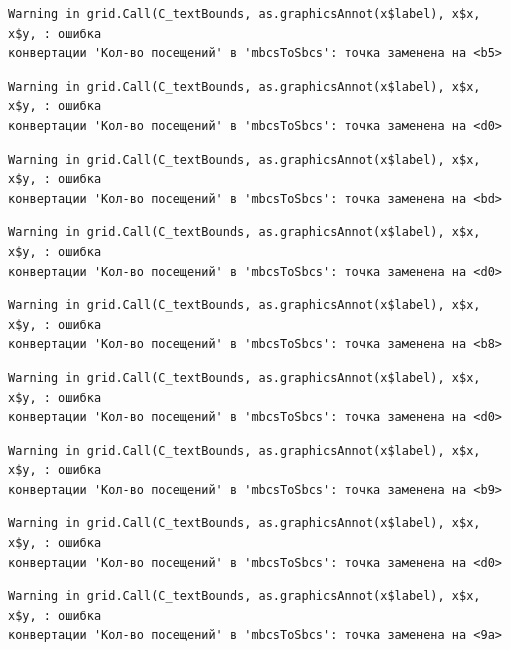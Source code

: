\documentclass[
  letterpaper,
  DIV=11,
  numbers=noendperiod]{scrreprt}
\begin{document}
\begin{verbatim}
Warning in grid.Call(C_textBounds, as.graphicsAnnot(x$label), x$x, x$y, : ошибка
конвертации 'Кол-во посещений' в 'mbcsToSbcs': точка заменена на <b5>
\end{verbatim}

\begin{verbatim}
Warning in grid.Call(C_textBounds, as.graphicsAnnot(x$label), x$x, x$y, : ошибка
конвертации 'Кол-во посещений' в 'mbcsToSbcs': точка заменена на <d0>
\end{verbatim}

\begin{verbatim}
Warning in grid.Call(C_textBounds, as.graphicsAnnot(x$label), x$x, x$y, : ошибка
конвертации 'Кол-во посещений' в 'mbcsToSbcs': точка заменена на <bd>
\end{verbatim}

\begin{verbatim}
Warning in grid.Call(C_textBounds, as.graphicsAnnot(x$label), x$x, x$y, : ошибка
конвертации 'Кол-во посещений' в 'mbcsToSbcs': точка заменена на <d0>
\end{verbatim}

\begin{verbatim}
Warning in grid.Call(C_textBounds, as.graphicsAnnot(x$label), x$x, x$y, : ошибка
конвертации 'Кол-во посещений' в 'mbcsToSbcs': точка заменена на <b8>
\end{verbatim}

\begin{verbatim}
Warning in grid.Call(C_textBounds, as.graphicsAnnot(x$label), x$x, x$y, : ошибка
конвертации 'Кол-во посещений' в 'mbcsToSbcs': точка заменена на <d0>
\end{verbatim}

\begin{verbatim}
Warning in grid.Call(C_textBounds, as.graphicsAnnot(x$label), x$x, x$y, : ошибка
конвертации 'Кол-во посещений' в 'mbcsToSbcs': точка заменена на <b9>
\end{verbatim}

\begin{verbatim}
Warning in grid.Call(C_textBounds, as.graphicsAnnot(x$label), x$x, x$y, : ошибка
конвертации 'Кол-во посещений' в 'mbcsToSbcs': точка заменена на <d0>
\end{verbatim}

\begin{verbatim}
Warning in grid.Call(C_textBounds, as.graphicsAnnot(x$label), x$x, x$y, : ошибка
конвертации 'Кол-во посещений' в 'mbcsToSbcs': точка заменена на <9a>
\end{verbatim}
\end{document}

